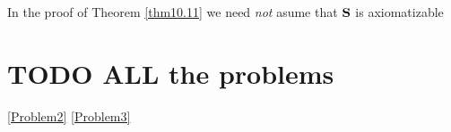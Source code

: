 \documentclass[11pt]{article}
\begin{document}
In the proof of Theorem \ref{thm10.11} we need \emph{not} asume that \(\operatorname{\textbf{S}}\) is axiomatizable

\section{{\bfseries\sffamily TODO} ALL the problems}
\label{sec:org61d6dac}

\ref{Problem2}
\ref{Problem3}
\end{document}
